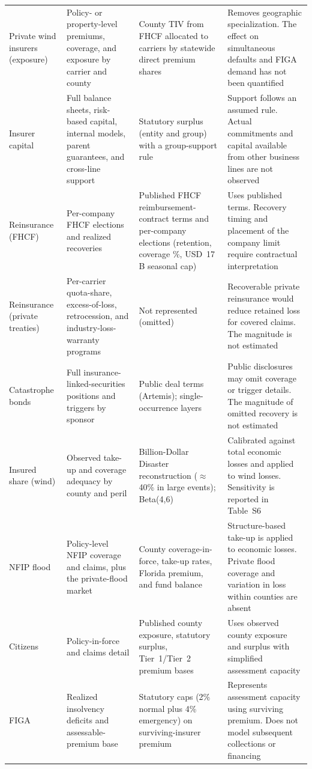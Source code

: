 \documentclass[fleqn,10pt]{wlscirep}
\begin{document}
\begin{table}[t]
{\begin{tabular}{@{}p{} p{} p{} p{}@{}}
\midrule
Private wind insurers (exposure) & Policy- or property-level premiums, coverage, and exposure by carrier and county & County TIV from FHCF allocated to carriers by statewide direct premium shares & Removes geographic specialization. The effect on simultaneous defaults and FIGA demand has not been quantified \\
Insurer capital & Full balance sheets, risk-based capital, internal models, parent guarantees, and cross-line support & Statutory surplus (entity and group) with a group-support rule & Support follows an assumed rule. Actual commitments and capital available from other business lines are not observed \\
Reinsurance (FHCF) & Per-company FHCF elections and realized recoveries & Published FHCF reimbursement-contract terms and per-company elections (retention, coverage \%, USD~17\,B seasonal cap) & Uses published terms. Recovery timing and placement of the company limit require contractual interpretation \\
Reinsurance (private treaties) & Per-carrier quota-share, excess-of-loss, retrocession, and industry-loss-warranty programs & Not represented (omitted) & Recoverable private reinsurance would reduce retained loss for covered claims. The magnitude is not estimated \\
Catastrophe bonds & Full insurance-linked-securities positions and triggers by sponsor & Public deal terms (Artemis); single-occurrence layers & Public disclosures may omit coverage or trigger details. The magnitude of omitted recovery is not estimated \\
Insured share (wind) & Observed take-up and coverage adequacy by county and peril & Billion-Dollar Disaster reconstruction ($\approx$40\% in large events); Beta(4,6) & Calibrated against total economic losses and applied to wind losses. Sensitivity is reported in Table~S6 \\
NFIP flood & Policy-level NFIP coverage and claims, plus the private-flood market & County coverage-in-force, take-up rates, Florida premium, and fund balance & Structure-based take-up is applied to economic losses. Private flood coverage and variation in loss within counties are absent \\
Citizens & Policy-in-force and claims detail & Published county exposure, statutory surplus, Tier~1/Tier~2 premium bases & Uses observed county exposure and surplus with simplified assessment capacity \\
FIGA & Realized insolvency deficits and assessable-premium base & Statutory caps (2\% normal plus 4\% emergency) on surviving-insurer premium & Represents assessment capacity using surviving premium. Does not model subsequent collections or financing \\

\end{tabular}}
\end{table}
\end{document}
